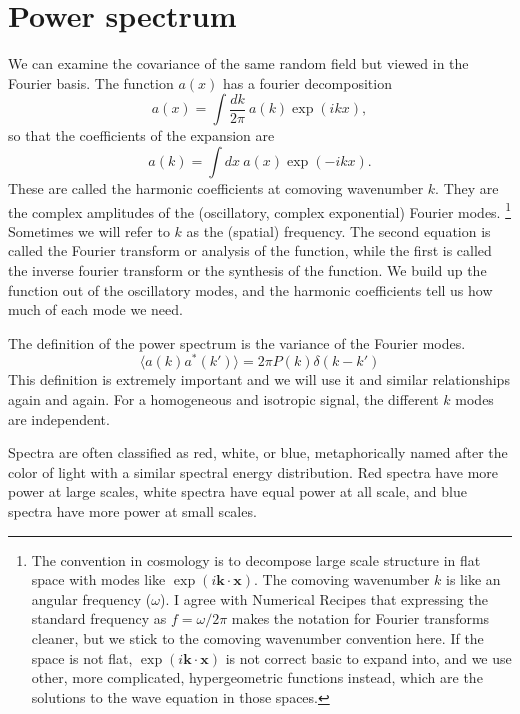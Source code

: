 \section{Power spectrum}
We can examine the covariance of the same random field but viewed in the Fourier basis.
The function $a(x)$ has a fourier decomposition
\begin{equation}
  a(x) = \int \frac{dk}{2\pi}\ a(k) \exp(i kx),
\end{equation}
so that the coefficients of the expansion are 
\begin{equation}
  a(k) = \int dx\ a(x) \exp(-i kx).
\end{equation}
These are called the harmonic coefficients at comoving wavenumber $k$.  They are the complex amplitudes of the (oscillatory, complex exponential) Fourier modes.%
%
\footnote{The convention in cosmology is to decompose large scale structure in flat space with modes like $\exp(i \mathbf{k} \cdot \mathbf{x})$.  The comoving wavenumber $k$ is like an angular frequency ($\omega$).  I agree with Numerical Recipes \citep{} that expressing the standard frequency as $f = \omega/2\pi$ makes the notation for Fourier transforms cleaner, but  we stick to the comoving wavenumber convention here.  If the space is not flat, $\exp(i \mathbf{k}\cdot \mathbf{x})$ is not correct basic to expand into, and we use other, more complicated, hypergeometric functions instead, which are the solutions to the wave equation in those spaces.}  Sometimes we will refer to $k$ as the (spatial) frequency.
The second equation is called the Fourier transform or analysis of the function, while the first is called the inverse fourier transform or the synthesis of the function.  We build up the function out of the oscillatory modes, and the harmonic coefficients tell us how much of each mode we need.

The definition of the power spectrum is the variance of the Fourier modes.
\begin{equation}
  \langle a(k) a^*(k') \rangle = 2\pi P(k) \delta(k - k') 
\end{equation}
This definition is extremely important and we will use it and similar relationships again and again.  For a homogeneous and isotropic signal, the different $k$ modes are independent.

Spectra are often classified as red, white, or blue, metaphorically named after the color of light with a similar spectral energy distribution.  Red spectra have more power at large scales, white spectra have equal power at all scale, and blue spectra have more power at small scales.

